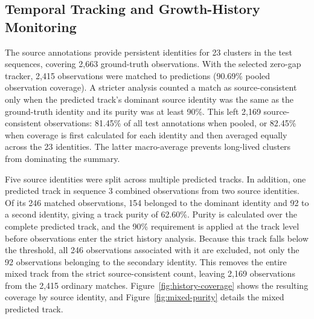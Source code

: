 \documentclass[11pt,a4paper]{article}
\begin{document}
\subsection{Temporal Tracking and Growth-History Monitoring}

The source annotations provide persistent identities for 23 clusters in the test sequences, covering 2,663 ground-truth observations. With the selected zero-gap tracker, 2,415 observations were matched to predictions (90.69\% pooled observation coverage). A stricter analysis counted a match as source-consistent only when the predicted track's dominant source identity was the same as the ground-truth identity and its purity was at least 90\%. This left 2,169 source-consistent observations: 81.45\% of all test annotations when pooled, or 82.45\% when coverage is first calculated for each identity and then averaged equally across the 23 identities. The latter macro-average prevents long-lived clusters from dominating the summary.

Five source identities were split across multiple predicted tracks. In addition, one predicted track in sequence 3 combined observations from two source identities. Of its 246 matched observations, 154 belonged to the dominant identity and 92 to a second identity, giving a track purity of 62.60\%. Purity is calculated over the complete predicted track, and the 90\% requirement is applied at the track level before observations enter the strict history analysis. Because this track falls below the threshold, all 246 observations associated with it are excluded, not only the 92 observations belonging to the secondary identity. This removes the entire mixed track from the strict source-consistent count, leaving 2,169 observations from the 2,415 ordinary matches. Figure~\ref{fig:history-coverage} shows the resulting coverage by source identity, and Figure~\ref{fig:mixed-purity} details the mixed predicted track.
\end{document}
